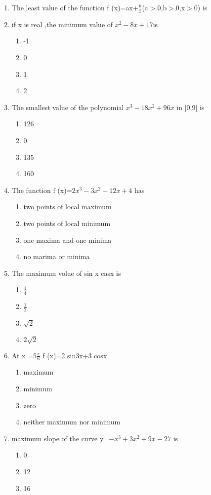 \documentclass[12pt]{article}
\begin{document}
\begin{enumerate}
\item The least value of the function f (x)=ax+$\frac{b}{x}$(a$>$0,b$>$0,x$>$0) is \makebox[1cm]{\hrulefill}
\item if x is real ,the minimum value of $x^2-8x+17$is
\begin{enumerate}
\item -1
\item 0
\item 1
\item 2
\end{enumerate}
\item The smallest value of the polynomial $x^3-18x^2+96x$ in [0,9] is
\begin{enumerate}
\item 126
\item 0
\item 135 
\item 160
\end{enumerate}
\item The function f (x)=$2x^3-3x^2-12x+4$ has
\begin{enumerate} 
\item two points of local maximum
\item two points of local minimum
\item one maxima and one minima
\item no marima or minima
\end{enumerate}
\item The maximum volue of sin x casx is 
\begin{enumerate} 
\item $\frac{1}{4}$
\item $\frac{1}{2}$
\item $\sqrt{2}$
\item $2\sqrt{2}$
\end{enumerate}
\item At x =5$\frac{\pi}{6}$ f (x)=2 sin3x+3 cosx
\begin{enumerate} 
\item maximum
\item minimum
\item zero
\item neither maximum nor minimum
\end{enumerate}
\item maximum slope of the curve y=$-x^3+ 3x^2+9x-27$ is
\begin{enumerate} 
\item 0
\item 12
\item 16

\end{enumerate}
\end{enumerate}
\end{document}
